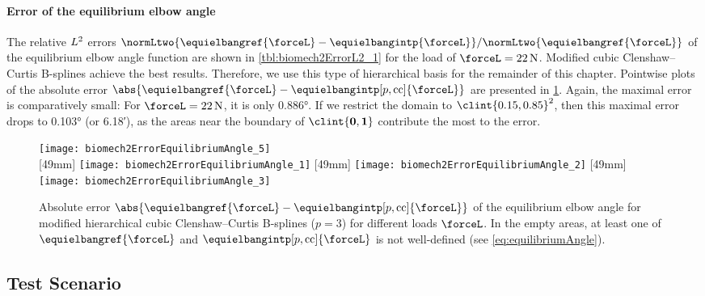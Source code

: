 \paragraph{Error of the equilibrium elbow angle}

The relative $L^2$ errors
$\normLtwo{\equielbangref{\forceL} - \equielbangintp{\forceL}}/
\normLtwo{\equielbangref{\forceL}}$
of the equilibrium elbow angle function are shown in
\cref{tbl:biomech2ErrorL2_1} for the load of
$\forceL = \SI{22}{\newton}$.
Modified cubic Clenshaw--Curtis B-splines achieve the best results.
Therefore, we use this type of hierarchical basis
for the remainder of this chapter.
Pointwise plots of the absolute error
$\abs{\equielbangref{\forceL} - \equielbangintp[p,\cc]{\forceL}}$
are presented in \cref{fig:biomech2ErrorEquilibriumAngle}.
Again, the maximal error is comparatively small:
For $\forceL = \SI{22}{\newton}$, it is only \ang{0.886}.
If we restrict the domain to $\clint{0.15, 0.85}^2$,
then this maximal error drops to \ang{0.103} (or \ang{;6.18;}),
as the areas near the boundary of $\clint{\*0, \*1}$
contribute the most to the error.

\begin{figure}
  \texttt{[image: biomech2ErrorEquilibriumAngle\_5]}%
  \\[2mm]%
  [49mm]{%
    \texttt{[image: biomech2ErrorEquilibriumAngle\_1]}%
  }%
  \hfill%
  [49mm]{%
    \texttt{[image: biomech2ErrorEquilibriumAngle\_2]}%
  }%
  \hfill%
  [49mm]{%
    \texttt{[image: biomech2ErrorEquilibriumAngle\_3]}%
  }%
  \caption[Absolute error of the equilibrium elbow angle]{%
    Absolute error
    $\abs{\equielbangref{\forceL} - \equielbangintp[p,\cc]{\forceL}}$
    of the equilibrium elbow angle for
    modified hierarchical cubic Clenshaw--Curtis B-splines ($p = 3$)
    for different loads $\forceL$.
    In the empty areas, at least one of
    $\equielbangref{\forceL}$ and $\equielbangintp[p,\cc]{\forceL}$
    is not well-defined (see \cref{eq:equilibriumAngle}).%
  }%
  \label{fig:biomech2ErrorEquilibriumAngle}%
\end{figure}



\subsection{Test Scenario}
\label{sec:734scenario}

